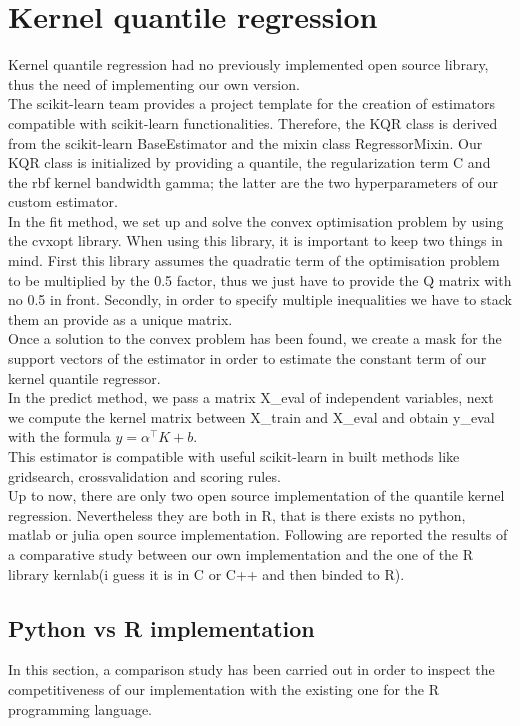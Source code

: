 \section{Kernel quantile regression}
Kernel quantile regression had no previously implemented open source library, thus the need of implementing our own version.
\\
The scikit-learn team provides a project template for the creation of estimators compatible with scikit-learn functionalities. Therefore, the KQR class is derived from the scikit-learn BaseEstimator and the mixin class RegressorMixin.
Our KQR class is initialized by providing a quantile, the regularization term C and the rbf kernel bandwidth gamma; the latter are the two hyperparameters of our custom estimator.
\\
In the fit method, we set up and solve the convex optimisation problem by using the cvxopt library. 
When using this library, it is important to keep two things in mind. First this library assumes the quadratic term of the optimisation problem to be multiplied by the 0.5 factor, thus we just have to provide the Q matrix with no 0.5 in front.
Secondly, in order to specify multiple inequalities we have to stack them an provide as a unique matrix.
\\
Once a solution to the convex problem has been found, we create a mask for the support vectors of the estimator in order to estimate the constant term of our kernel quantile regressor.
\\
In the predict method, we pass a matrix X\_eval of independent variables, next we compute the kernel matrix between X\_train and X\_eval and obtain y\_eval with the formula $y=\alpha^\intercal K+b$.
\\
This estimator is compatible with useful scikit-learn in built methods like gridsearch, crossvalidation and scoring rules.
\\
Up to now, there are only two open source implementation of the quantile kernel regression. Nevertheless they are both in R, that is there exists no python, matlab or julia open source implementation. Following are reported the results of a comparative study between our own implementation and the one of the R library kernlab(i guess it is in C or C++ and then binded to R).
\subsection{Python vs R implementation}
In this section, a comparison study has been carried out in order to inspect the competitiveness of our implementation with the existing one for the R programming language.